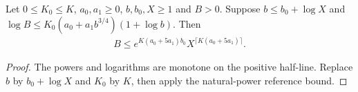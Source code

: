\begin{lemma}
    \label{lem:reference_profile_polynomial}
    \leanok
    Let $0\le K_0\le K$, $a_0,a_1\ge0$, $b,b_0,X\ge1$ and $B>0$.
    Suppose $b\le b_0+\log X$ and
    $\log B\le K_0(a_0+a_1b^{3/4})(1+\log b)$. Then
    \begin{align}
        B\le e^{K(a_0+5a_1)b_0}
        X^{\lceil K(a_0+5a_1)\rceil}.
        \label{eq:reference_profile_polynomial}
    \end{align}
\end{lemma}
\begin{proof}\leanok
    The powers and logarithms are monotone on the positive half-line.
    Replace $b$ by $b_0+\log X$ and $K_0$ by $K$, then apply the
    natural-power reference bound.
\end{proof}
